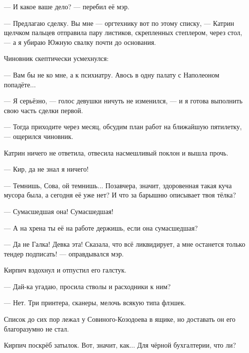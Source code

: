 --- И какое ваше дело? --- перебил её мэр.

--- Предлагаю сделку. Вы мне --- оргтехнику вот по этому списку,
--- Катрин щелчком пальцев отправила пару листиков, скрепленных степлером, через стол,
--- а я убираю Южную свалку почти до основания.

Чиновник скептически усмехнулся:

--- Вам бы не ко мне, а к психиатру. Авось в одну палату с Наполеоном попадёте...

--- Я серьёзно, --- голос девушки ничуть не изменился, --- и я готова выполнить свою часть сделки первой.

--- Тогда приходите через месяц, обсудим план работ на ближайшую пятилетку, --- ощерился чиновник.

Катрин ничего не ответила, отвесила насмешливый поклон и вышла прочь.

\emptypar

--- Кир, да не знал я ничего!

--- Темнишь, Сова, ой темнишь... Позавчера, значит, здоровенная такая куча мусора была, а сегодня её уже нет?
И что за барышню описывает твоя тёлка?

--- Сумасшедшая она! Сумасшедшая!

--- А на хрена ты её на работе держишь, если она сумасшедшая?

--- Да не Галка! Девка эта! Сказала, что всё ликвидирует, а мне останется только тендер подписать! --- оправдывался мэр.

Кирпич вздохнул и отпустил его галстук.

--- Дай-ка угадаю, просила стволы и расходники к ним?

--- Нет. Три принтера, сканеры, мелочь всякую типа флэшек.

Список до сих пор лежал у Совиного-Козодоева в ящике, но доставать он его благоразумно не стал.

Кирпич поскрёб затылок. Вот, значит, как... Для чёрной бухгалтерии, что ли?

\emptypar


